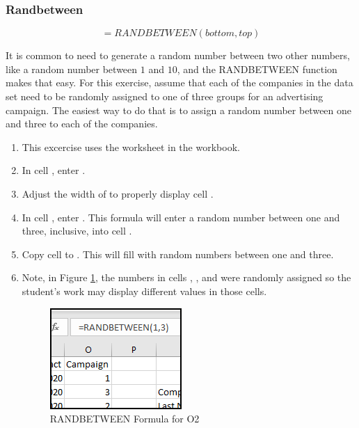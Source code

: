\subsubsection{Randbetween}

\[ =RANDBETWEEN(bottom, top) \]

It is common to need to generate a random number between two other numbers, like a random number between $ 1 $ and $ 10 $, and the RANDBETWEEN function makes that easy. For this exercise, assume that each of the companies in the data set need to be randomly assigned to one of  three groups for an advertising campaign. The easiest way to do that is to assign a random number between one and three to each of the companies.

\begin{enumerate}
	\item This excercise uses the  worksheet in the  workbook.
	\item In cell , enter .
	\item Adjust the width of  to properly display cell .
	\item In cell , enter . This formula will enter a random number between one and three, inclusive, into cell .
	\item Copy cell  to . This will fill  with random numbers between one and three.
	\item Note, in Figure \ref{09:fig44}, the numbers in cells , , and  were randomly assigned so the student's work may display different values in those cells.
	
	\begin{figure}[H]
		\centering
		\includegraphics[width=\maxwidth{.50\linewidth}]{gfx/ch09_fig44}
		\caption{RANDBETWEEN Formula for O2}
		\label{09:fig44}
	\end{figure}
	
\end{enumerate}
	
